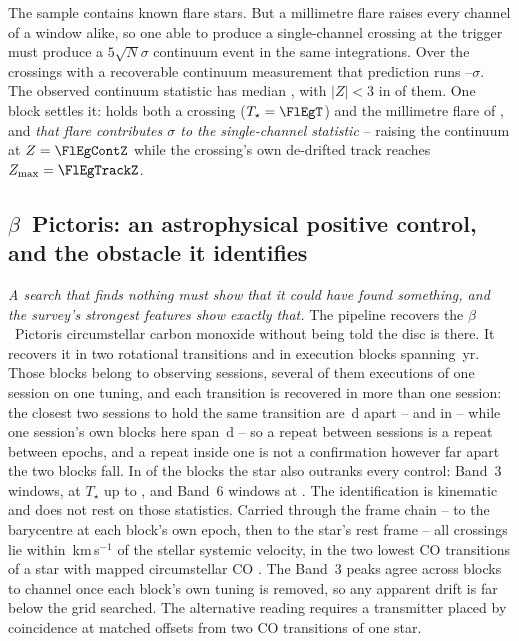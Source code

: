 The sample contains known flare stars. But a millimetre flare raises every
channel of a window alike, so one able to produce a single-channel crossing at
the trigger must produce a $5\sqrt{N}\sigma$ continuum event in the same
integrations. Over the \FlNCont{} crossings with a recoverable continuum measurement
that prediction runs \FlPredLo--\FlPredHi$\sigma$. The observed continuum
statistic has median \FlObsMed, with $|Z|<3$ in \FlNQuiet{} of them. One block settles it: \FlEgStar{} \texttt{\FlEgEb} holds both a
crossing ($T_\star=\FlEgT$) and the millimetre flare of
\citet{MacGregor2020}, and \emph{that flare contributes \FlEgContrib$\sigma$
to the single-channel statistic} -- raising the continuum at $Z=\FlEgContZ$
while the crossing's own de-drifted track reaches $Z_{\max}=\FlEgTrackZ$.

\subsection{$\beta$~Pictoris: an astrophysical positive control, and the
obstacle it identifies} \label{sec:bpicval}

\emph{A search that finds nothing must show that it could have found
something, and the survey's strongest features show exactly that.} The
pipeline recovers the $\beta$~Pictoris circumstellar carbon monoxide
without being told the disc is there. It recovers it in two
rotational transitions and in \CsBpCoBlocks{} execution
blocks spanning \BpBaselineYr\,yr. Those blocks belong to \CsBpCoSess{}
observing sessions, several of them executions of one session on one
tuning, and each transition is recovered in more than one session: the
closest two sessions to hold the same transition are \CsBpCoSepMinD\,d
apart -- \texttt{\NbSessEbOne} and \texttt{\NbSessEbTwo} in
\NbSessLine{} -- while one session's own blocks here span \QfBpSameSessD\,d
-- so a
repeat between sessions is a repeat between epochs, and a repeat inside one
is not a confirmation however far apart the two blocks fall.
In \NStageOneBpicEb{} of the blocks the star also outranks every control:
\BpicNFlagThree{} Band~3 windows, at $T_\star$ up to \BpicBThreeTsym, and
\BpicNFlagSix{} Band~6 windows at \BpicBSixTsym. The identification is kinematic and does not rest on those
statistics. Carried through the frame chain -- to the barycentre at each
block's own epoch, then to the star's rest frame -- all \BpicPanelNCo{}
crossings lie within \BpicDvCoHi\,km\,s$^{-1}$ of the stellar systemic
velocity, in the two lowest CO transitions of a star with mapped
circumstellar CO \citep{Dent2014,Matra2017}. The Band~3 peaks agree across blocks to
\BpRecThreeTuneChanMax{} channel once each block's own tuning is removed, so
any apparent drift is far below the grid searched. The alternative reading
requires a transmitter placed by coincidence at matched offsets from two CO
transitions of one star.

